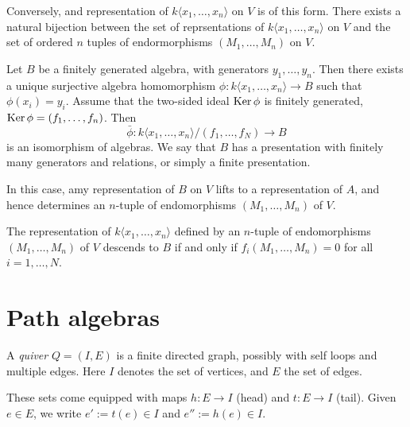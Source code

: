 \begin{thm}
Conversely, and representation of \(k\langle x_{1},\ldots ,x_{n}\rangle \) on \(V\) is of this form. There exists a natural bijection between the set of reprsentations of \(k\langle x_{1},\ldots ,x_{n}\rangle \) on \(V\) and the set of ordered \(n\) tuples of endormorphisms \((M_{1},\ldots ,M_{n})\) on \(V\).
\end{thm}

\begin{thm}
Let \(B\) be a finitely generated algebra, with generators \(y_{1},\ldots ,y_{n}\). Then there exists a unique surjective algebra homomorphism \(\phi :k\langle x_{1},\ldots ,x_{n}\rangle \rightarrow B\) such that \(\phi (x_{i})=y_{i}\). Assume that the two-sided ideal \(\operatorname{Ker}\phi \) is finitely generated, \(\operatorname{Ker} \phi =(f_{1},\ldots ,f_{n})\). Then
\[\bar{\phi }: k\langle x_{1},\ldots ,x_{n}\rangle  / (f_{1},\ldots ,f_{N} )\rightarrow B\]
is an isomorphism of algebras. We say that \(B\) has a presentation with finitely many generators and relations, or simply a finite presentation.

In this case, amy representation of \(B\) on \(V\) lifts to a representation of \(A\), and hence determines an \(n\)-tuple of endomorphisms \((M_{1},\ldots ,M_{n})\) of \(V\).

\end{thm}

\begin{thm}
The representation of \(k\langle x_{1},\ldots ,x_{n}\rangle  \) defined by an \(n\)-tuple of endomorphisms \((M_{1},\ldots ,M_{n})\) of \(V\) descends to \(B\) if and only if \(f_{i}(M_{1},\ldots ,M_{n})=0\) for all \(i=1,\ldots ,N\).
\end{thm}

\newpage

\section{Path algebras}

\begin{defn}
A \emph{quiver} \(Q=(I,E)\) is a finite directed graph, possibly with self loops and multiple edges. Here \(I\) denotes the set of vertices, and \(E\) the set of edges.

These sets come equipped with maps \(h:E\rightarrow I\) (head) and \(t:E\rightarrow I\) (tail). Given \(e\in E\), we write \(e':=t(e)\in I\) and \(e'':=h(e)\in I\).

\end{defn}

